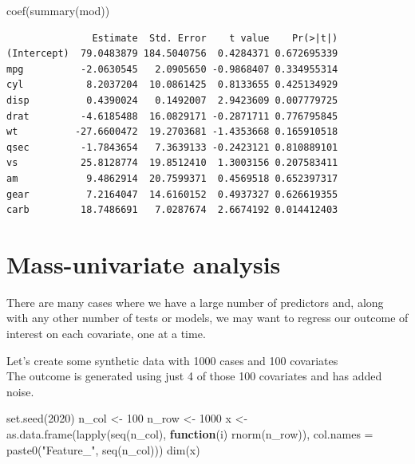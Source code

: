\documentclass[
]{book}
\newenvironment{Shaded}{\begin{snugshade}}{\end{snugshade}}
\newcommand{\AttributeTok}[1]{\textcolor[rgb]{0.77,0.63,0.00}{#1}}
\newcommand{\ControlFlowTok}[1]{\textcolor[rgb]{0.13,0.29,0.53}{\textbf{#1}}}
\newcommand{\DecValTok}[1]{\textcolor[rgb]{0.00,0.00,0.81}{#1}}
\newcommand{\FunctionTok}[1]{\textcolor[rgb]{0.00,0.00,0.00}{#1}}
\newcommand{\NormalTok}[1]{#1}
\newcommand{\OtherTok}[1]{\textcolor[rgb]{0.56,0.35,0.01}{#1}}
\newcommand{\StringTok}[1]{\textcolor[rgb]{0.31,0.60,0.02}{#1}}
\begin{document}
\begin{Shaded}
\begin{Highlighting}[]
\FunctionTok{coef}\NormalTok{(}\FunctionTok{summary}\NormalTok{(mod))}
\end{Highlighting}
\end{Shaded}

\begin{verbatim}
               Estimate  Std. Error    t value    Pr(>|t|)
(Intercept)  79.0483879 184.5040756  0.4284371 0.672695339
mpg          -2.0630545   2.0905650 -0.9868407 0.334955314
cyl           8.2037204  10.0861425  0.8133655 0.425134929
disp          0.4390024   0.1492007  2.9423609 0.007779725
drat         -4.6185488  16.0829171 -0.2871711 0.776795845
wt          -27.6600472  19.2703681 -1.4353668 0.165910518
qsec         -1.7843654   7.3639133 -0.2423121 0.810889101
vs           25.8128774  19.8512410  1.3003156 0.207583411
am            9.4862914  20.7599371  0.4569518 0.652397317
gear          7.2164047  14.6160152  0.4937327 0.626619355
carb         18.7486691   7.0287674  2.6674192 0.014412403
\end{verbatim}

\hypertarget{mass-univariate-analysis}{%
\section{Mass-univariate analysis}\label{mass-univariate-analysis}}

There are many cases where we have a large number of predictors and, along with any other number of tests or models, we may want to regress our outcome of interest on each covariate, one at a time.

Let's create some synthetic data with 1000 cases and 100 covariates\\
The outcome is generated using just 4 of those 100 covariates and has added noise.

\begin{Shaded}
\begin{Highlighting}[]
\FunctionTok{set.seed}\NormalTok{(}\DecValTok{2020}\NormalTok{)}
\NormalTok{n\_col }\OtherTok{\textless{}{-}} \DecValTok{100}
\NormalTok{n\_row }\OtherTok{\textless{}{-}} \DecValTok{1000}
\NormalTok{x }\OtherTok{\textless{}{-}} \FunctionTok{as.data.frame}\NormalTok{(}\FunctionTok{lapply}\NormalTok{(}\FunctionTok{seq}\NormalTok{(n\_col), }\ControlFlowTok{function}\NormalTok{(i) }\FunctionTok{rnorm}\NormalTok{(n\_row)),}
                   \AttributeTok{col.names =} \FunctionTok{paste0}\NormalTok{(}\StringTok{"Feature\_"}\NormalTok{, }\FunctionTok{seq}\NormalTok{(n\_col)))}
\FunctionTok{dim}\NormalTok{(x)}
\end{Highlighting}
\end{Shaded}
\end{document}
